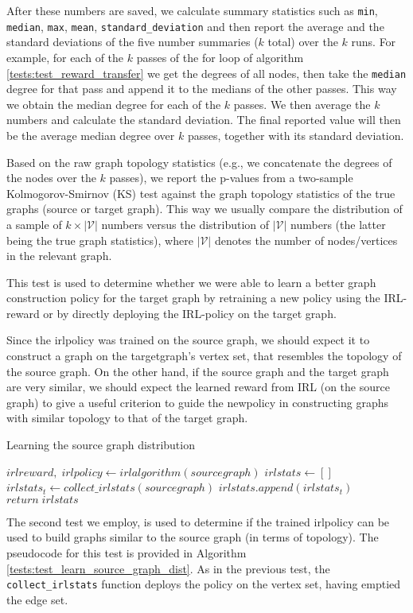 \documentclass{report}
\numberwithin{equation}{section}
\numberwithin{figure}{section}
\numberwithin{table}{section}
\numberwithin{algorithm}{section}
\begin{document}
After these numbers are saved, we calculate summary 
statistics such as \verb|min|, \verb|median|, \verb|max|, 
\verb|mean|, \verb|standard_deviation| and 
then report the average and the standard deviations of the five number 
summaries ($k$ total) over the $k$ runs. For example, for each of the 
$k$ passes of the for loop of algorithm \ref{tests:test_reward_transfer} 
we get the degrees of all nodes, then take the \verb|median| degree for 
that pass and append it to the medians of the other passes. This way 
we obtain the median degree for each of the $k$ passes. We then average 
the $k$ numbers and calculate the standard deviation. The final reported 
value will then be the average median degree over $k$ passes, together 
with its standard deviation.

Based on the raw graph topology statistics (e.g., we concatenate the 
degrees of the nodes over the $k$ passes), we report the 
p-values from a two-sample Kolmogorov-Smirnov (KS) \citep{KSTest} 
test against the 
graph topology statistics of the true graphs (source or target graph). 
This way we usually compare the distribution of a sample of $k\times |\mathcal{V}|$ 
numbers versus the distribution of $|\mathcal{V}|$ numbers (the latter being the 
true graph statistics), where $|\mathcal{V}|$ denotes the number 
of nodes/vertices in the relevant graph.

This test is used to determine whether we were able to learn a better 
graph construction policy for the target graph 
by retraining a new policy using the IRL-reward 
or by directly deploying the IRL-policy on the target graph.

Since the irlpolicy was trained on the source graph, we should expect 
it to construct a graph on the targetgraph's vertex set, that resembles 
the topology of the source graph. On the other hand, if the source 
graph and the target graph are very similar, we should expect 
the learned reward from IRL (on the source graph) to give a useful 
criterion to guide the 
newpolicy in constructing graphs with similar topology to that 
of the target graph.

\begin{algorithm}
  \caption{Learning the source graph distribution}
  \label{tests:test_learn_source_graph_dist}
  \begin{algorithmic}
    \State $irlreward,\; irlpolicy \gets irlalgorithm(sourcegraph)$
    \State $irlstats \gets []$
    \State $irlstats_t\gets collect\_irlstats(sourcegraph)$
    \State $irlstats.append(irlstats_t)$
    \EndFor
    \State $return\; irlstats$
  \end{algorithmic}
\end{algorithm}
The second test we employ, is used to determine if the trained 
irlpolicy can be used 
to build graphs similar to the source graph (in terms of topology). 
The pseudocode for this test is provided in Algorithm 
\ref{tests:test_learn_source_graph_dist}.
As in the previous test, the \verb|collect_irlstats| 
function deploys 
the policy on the vertex set, having emptied the edge set.
\end{document}
